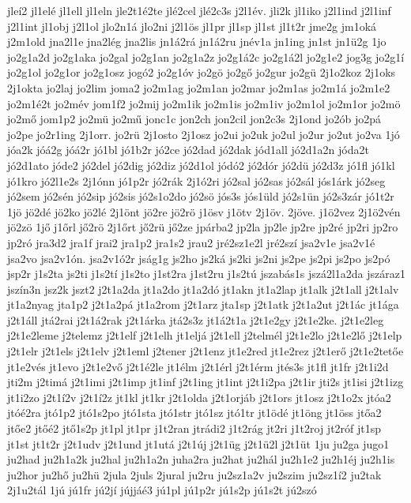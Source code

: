 {jleí2
jl1elé
jl1ell
jl1eln
jle2t1é2te
jlé2cel
jlé2c3s
j2l1év.
jli2k
jl1iko
j2l1ind
j2l1inf
j2l1int
jl1obj
j2l1ol
jlo2n1á
jlo2ni
j2l1ös
jl1pr
jl1sp
jl1st
jl1t2r
jme2g
jm1oká
j2m1old
jna2l1e
jna2lég
jna2lis
jn1á2rá
jn1á2ru
jnév1a
jn1ing
jn1st
jn1ü2g
1jo
jo2g1a2d
jo2g1aka
jo2gal
jo2g1an
jo2g1a2z
jo2g1á2c
jo2g1á2l
jo2g1e2
jog3g
jo2g1í
jo2g1ol
jo2g1or
jo2g1osz
jogó2
jo2g1óv
jo2gö
jo2gő
jo2gur
jo2gü
2j1o2koz
2j1oks
2j1okta
jo2laj
jo2lim
joma2
jo2m1ag
jo2m1an
jo2mar
jo2m1as
jo2m1á
jo2m1e2
jo2m1é2t
jo2mév
jom1f2
jo2mij
jo2m1ik
jo2m1is
jo2m1iv
jo2m1ol
jo2m1or
jo2mö
jo2mő
jom1p2
jo2mü
jo2mű
jonc1c
jon2ch
jon2cil
jon2c3s
2j1ond
jo2ób
jo2pá
jo2pe
jo2r1ing
2j1orr.
jo2rü
2j1osto
2j1osz
jo2ui
jo2uk
jo2ul
jo2ur
jo2ut
jo2va
1jó
jóa2k
jóá2g
jóá2r
jó1bl
jó1b2r
jó2ce
jó2dad
jó2dak
jód1all
jó2d1a2n
jóda2t
jó2d1ato
jóde2
jó2del
jó2dig
jó2diz
jó2d1ol
jódó2
jó2dór
jó2dü
jó2d3z
jó1fl
jó1kl
jó1kro
jó2l1e2s
2j1ónn
jó1p2r
jó2rák
2j1ó2ri
jó2sal
jó2sas
jó2sál
jós1árk
jó2seg
jó2sem
jó2sén
jó2sip
jó2sis
jó2s1o2do
jó2sö
jós3s
jós1üld
jó2s1ün
jó2s3zár
jó1t2r
1jö
jö2dé
jö2ko
jö2lé
2j1önt
jö2re
jö2rö
j1ösv
j1ötv
2j1öv.
2jöve.
j1ö2vez
2j1ö2vén
jö2zö
1jő
j1őrl
jő2rö
2j1őrt
jő2rü
jő2ze
jpárba2
jp2la
jp2le
jp2re
jp2ré
jp2ri
jp2ro
jp2ró
jra3d2
jra1f
jrai2
jra1p2
jra1s2
jrau2
jré2sz1e2l
jré2szí
jsa2v1e
jsa2v1é
jsa2vo
jsa2v1ón.
jsa2v1ó2r
jság1g
js2ho
js2ká
js2ki
js2ni
js2pe
js2pi
js2po
js2pó
jsp2r
j1s2ta
js2ti
j1s2tí
j1s2to
j1st2ra
j1st2ru
j1s2tú
jszabás1s
jszá2l1a2da
jszáraz1
jszín3n
jsz2k
jszt2
j2t1a2da
jt1a2do
jt1a2dó
jt1akn
jt1a2lap
jt1alk
j2t1all
j2t1alv
jt1a2nyag
jta1p2
j2t1a2pá
jt1a2rom
j2t1arz
jta1sp
j2t1atk
j2t1a2ut
j2t1ác
jt1ága
j2t1áll
jtá2rai
j2t1á2rak
j2t1árka
jtá2s3z
jt1á2t1a
j2t1e2gy
j2t1e2ke.
j2t1e2leg
j2t1e2leme
j2telemz
j2t1elf
j2t1elh
jt1eljá
j2t1ell
j2telmél
j2t1e2lo
j2t1e2lő
j2t1elp
j2t1elr
j2t1els
j2t1elv
j2t1eml
j2tener
j2t1enz
jt1e2red
jt1e2rez
j2t1erő
j2t1e2tetőe
jt1e2vés
jt1evo
j2t1e2vő
j2t1é2le
jt1élm
j2t1érl
j2t1érm
jtés3s
jt1fl
jt1fr
j2t1i2d
jti2m
j2timá
j2t1imi
j2t1imp
jt1inf
j2t1ing
jt1int
j2t1i2pa
j2t1ir
jti2s
jt1isi
j2t1izg
jt1i2zo
j2t1í2v
j2t1í2z
jt1kl
jt1kr
j2t1olda
j2t1orjáb
j2t1ors
jt1osz
j2t1o2x
jtóa2
jtóé2ra
jtó1p2
jtó1s2po
jtó1sta
jtó1str
jtó1sz
jtó1tr
jt1ödé
jt1öng
jt1öss
jtőa2
jtőe2
jtőé2
jtő1s2p
jt1pl
jt1pr
j1t2ran
jtrádi2
j1t2rág
jt2ri
j1t2roj
jt2róf
jt1sp
jt1st
jt1t2r
j2t1udv
j2t1und
jt1utá
j2t1új
j2t1üg
j2t1ü2l
j2t1üt
1ju
ju2ga
jugo1
ju2had
ju2h1a2k
ju2hal
ju2h1a2n
juha2ra
ju2hat
ju2hál
ju2h1e2
ju2h1éj
ju2h1is
ju2hor
ju2hő
ju2hü
2jula
2juls
2jural
ju2ru
ju2sz1a2v
ju2szim
ju2sz1í2
ju2tak
2j1u2tál
1jú
jú1fr
jú2jí
jújjáé3
jú1pl
jú1p2r
jú1s2p
jú1s2t
jú2szó
}
